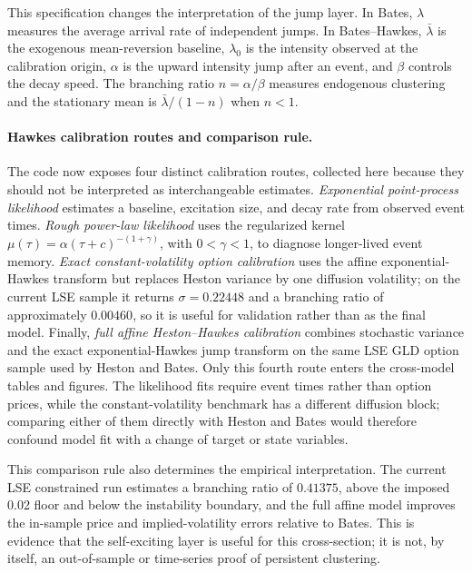 \documentclass[a4paper,10pt,titlepage,oneside,openany]{book}
\theoremstyle{plain}
\theoremstyle{definition}
\theoremstyle{remark}
\begin{document}
This specification changes the interpretation of the jump layer. In Bates, \(\lambda\) measures the average arrival rate of independent jumps. In Bates--Hawkes, \(\bar{\lambda}\) is the exogenous mean-reversion baseline, \(\lambda_0\) is the intensity observed at the calibration origin, \(\alpha\) is the upward intensity jump after an event, and \(\beta\) controls the decay speed. The branching ratio \(n=\alpha/\beta\) measures endogenous clustering and the stationary mean is \(\bar{\lambda}/(1-n)\) when \(n<1\).

\paragraph{Hawkes calibration routes and comparison rule.}
The code now exposes four distinct calibration routes, collected here because they should not be interpreted as interchangeable estimates. \emph{Exponential point-process likelihood} estimates a baseline, excitation size, and decay rate from observed event times. \emph{Rough power-law likelihood} uses the regularized kernel \(\mu(\tau)=\alpha(\tau+c)^{-(1+\gamma)}\), with \(0<\gamma<1\), to diagnose longer-lived event memory. \emph{Exact constant-volatility option calibration} uses the affine exponential-Hawkes transform but replaces Heston variance by one diffusion volatility; on the current LSE sample it returns \(\sigma=0.22448\) and a branching ratio of approximately \(0.00460\), so it is useful for validation rather than as the final model. Finally, \emph{full affine Heston--Hawkes calibration} combines stochastic variance and the exact exponential-Hawkes jump transform on the same LSE GLD option sample used by Heston and Bates. Only this fourth route enters the cross-model tables and figures. The likelihood fits require event times rather than option prices, while the constant-volatility benchmark has a different diffusion block; comparing either of them directly with Heston and Bates would therefore confound model fit with a change of target or state variables.

This comparison rule also determines the empirical interpretation. The current LSE constrained run estimates a branching ratio of \(0.41375\), above the imposed 0.02 floor and below the instability boundary, and the full affine model improves the in-sample price and implied-volatility errors relative to Bates. This is evidence that the self-exciting layer is useful for this cross-section; it is not, by itself, an out-of-sample or time-series proof of persistent clustering.
\end{document}
